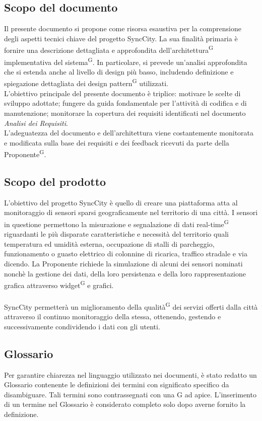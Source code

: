 \documentclass[8pt]{article}
\newcommand{\glossterm}[1]{#1\textsuperscript{G}} %
\begin{document}
\subsection{Scopo del documento}
Il presente documento si propone come risorsa esaustiva per la comprensione degli aspetti
tecnici chiave del progetto SyncCity. La sua finalità primaria è fornire una descrizione
dettagliata e approfondita dell’\glossterm{architettura} implementativa del \glossterm{sistema}. 
In particolare, si prevede un’analisi approfondita che si estenda anche al livello di design più
basso, includendo definizione e spiegazione dettagliata dei \glossterm{design pattern} utilizzati.\\
L’obiettivo principale del presente documento è triplice:
motivare le scelte di sviluppo adottate; fungere da guida fondamentale per l’attività di codifica e di manutenzione; monitorare la copertura dei requisiti identificati nel
documento \textit{Analisi dei Requisiti}. \\
L’adeguatezza del documento e dell’architettura viene costantemente monitorata e modificata sulla base dei
requisiti e dei feedback ricevuti da parte della \glossterm{Proponente}.
\subsection{Scopo del prodotto}
L'obiettivo del progetto SyncCity è quello di creare una piattaforma atta al monitoraggio
di sensori sparsi geograficamente nel territorio di una città. I sensori in questione
permettono la misurazione e segnalazione di dati \glossterm{real-time} riguardanti le più disparate
caratteristiche e necessità del territorio quali temperatura ed umidità esterna, occupazione di
stalli di parcheggio, funzionamento o guasto elettrico di colonnine di ricarica, traffico stradale e via
dicendo. La Proponente richiede la simulazione di alcuni dei sensori nominati nonchè la
gestione dei dati, della loro persistenza e della loro rappresentazione grafica attraverso \glossterm{widget} e
grafici. 
\\\\SyncCity permetterà un miglioramento della \glossterm{qualità} dei servizi offerti dalla città attraverso il continuo monitoraggio della stessa, ottenendo, gestendo e successivamente condividendo i dati con gli utenti. 
\subsection{Glossario}
Per garantire chiarezza nel linguaggio utilizzato nei documenti, è stato redatto un Glossario contenente le definizioni dei termini con significato specifico da disambiguare. Tali termini sono contrassegnati con una G ad apice. L'inserimento di un termine nel Glossario è considerato completo solo dopo averne fornito la definizione.
\end{document}
